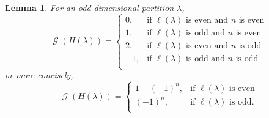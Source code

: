 \documentclass[12pt]{amsart}
\newtheorem{lemma}[theorem]{Lemma}
\theoremstyle{definition}
\numberwithin{equation}{section}
\DeclareMathOperator{\g}{\mathcal{G}}
\begin{document}
\begin{lemma}\label{prop:parity}
For an odd-dimensional partition $\lambda$,
\[
\g(H(\lambda)) = \begin{cases}
0, &\text{if }\ell(\lambda) \text{ is even and } n \text{ is even}\\
1, &\text{if }\ell(\lambda) \text{ is odd and } n \text{ is even}\\
2, &\text{if }\ell(\lambda) \text{ is even and } n \text{ is odd}\\
-1, &\text{if }\ell(\lambda) \text{ is odd and } n \text{ is odd}\\

\end{cases}
\]
or more concisely,
\[
\g(H(\lambda)) = \begin{cases}
1 - (-1)^n, &\text{if }\ell(\lambda) \text{ is even}\\
(-1)^n, & \text{if }\ell(\lambda) \text{ is odd}.\\
\end{cases}
\]
\end{lemma}
\end{document}
